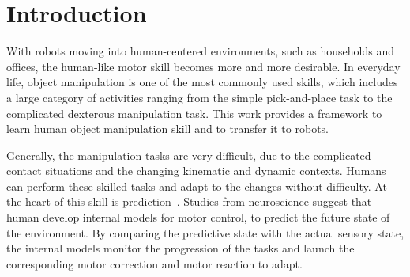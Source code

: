 \section{Introduction}
\label{intro}
With robots moving into human-centered environments, such as households and offices, the human-like motor skill becomes more and more desirable. In everyday life, object manipulation is one of the most commonly used skills, which includes a large category of activities ranging from the simple pick-and-place task to the complicated dexterous manipulation task. This work provides a framework to learn human object manipulation skill and to transfer it to robots.


Generally, the manipulation tasks are very difficult, due to the complicated contact situations and the changing kinematic and dynamic contexts. Humans can perform these skilled tasks and adapt to the changes without difficulty. At the heart of this skill is prediction~\cite{flanagan2006control}. Studies from neuroscience suggest that human develop internal models for motor control, to predict the future state of the environment. By comparing the predictive state with the actual sensory state, the internal models monitor the progression of the tasks and launch the corresponding motor correction and motor reaction to adapt. %


